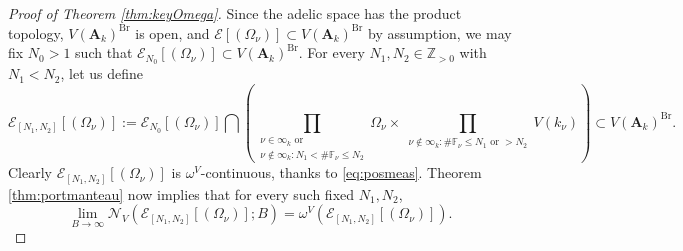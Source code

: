 \documentclass[11pt,letterpaper]{amsart}
\newcommand{\BF}{{\mathbb {F}}}
\newcommand{\BZ}{{\mathbb {Z}}}
\newcommand{\CE}{{\mathcal {E}}}
\newcommand{\CN}{{\mathcal {N}}}
\newcommand{\RA}{{\mathbf {A}}}
\theoremstyle{plain}
\numberwithin{equation}{section}
\theoremstyle{definition}
\theoremstyle{remark}
\begin{document}
\begin{proof}[Proof of Theorem \ref{thm:keyOmega}]
Since the adelic space has the product topology, $V(\RA_k)^{\operatorname{Br}}$ is open, and $\CE[(\Omega_{\nu})]\subset V(\RA_k)^{\operatorname{Br}}$ by assumption, we may fix $N_0>1$ such that $\CE_{N_0}[(\Omega_{\nu})]\subset V(\RA_k)^{\operatorname{Br}}$.
For every $N_1,N_2\in\BZ_{>0}$ with $ N_1<N_2$, let us define $$\CE_{[N_1,N_2]}[(\Omega_{\nu})]:=\CE_{N_0}[(\Omega_{\nu})]\bigcap\left(\prod_{\substack{\nu\in\infty_k \text{ or}\\\nu\notin\infty_k:N_1<\#\BF_\nu\leqslant N_2}}\Omega_\nu\times \prod_{\substack{\nu\notin\infty_k:\#\BF_\nu\leqslant N_1\text{ or }> N_2}}V(k_\nu)\right)\subset V(\RA_k)^{\operatorname{Br}}.$$ 
Clearly $\CE_{[N_1,N_2]}[(\Omega_{\nu})]$ is $\omega^V$-continuous, thanks to \eqref{eq:posmeas}. Theorem \ref{thm:portmanteau} now implies that for every such fixed $N_1,N_2$, \begin{equation}\label{eq:aN}
		\lim_{B\to\infty}\CN_V\left(\CE_{[N_1,N_2]}[(\Omega_{\nu})];B\right)=\omega^V\left(\CE_{[N_1,N_2]}[(\Omega_{\nu})]\right).
	\end{equation}


\end{proof}
\end{document}
